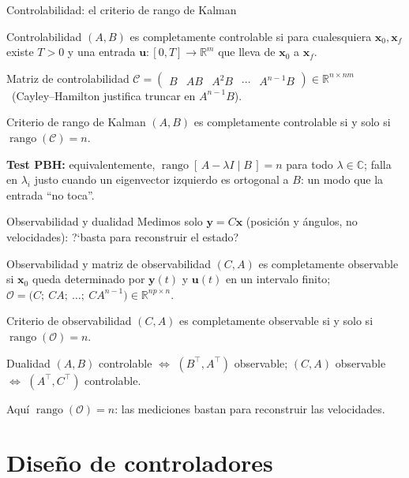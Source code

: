 \documentclass[aspectratio=169,11pt]{beamer}
\DeclareMathOperator{\rank}{rango}
\newcommand{\R}{\mathbb{R}}
\newcommand{\Cx}{\mathbb{C}}
\newcommand{\calC}{\mathcal{C}}
\newcommand{\calO}{\mathcal{O}}
\newcommand{\xv}{\bm{x}}
\newcommand{\uv}{\bm{u}}
\newcommand{\yv}{\bm{y}}
\begin{document}
\begin{frame}{Controlabilidad: el criterio de rango de Kalman}
  \begin{cajadef}{Controlabilidad}
    $(A,B)$ es completamente controlable si para cualesquiera $\xv_0,\xv_f$
    existe $T>0$ y una entrada $\uv:[0,T]\to\R^m$ que lleva de $\xv_0$ a $\xv_f$.
  \end{cajadef}
  \begin{cajadef}{Matriz de controlabilidad}
    $\calC=\begin{pmatrix}B & AB & A^2B & \cdots & A^{n-1}B\end{pmatrix}\in\R^{n\times nm}$
    \ (Cayley--Hamilton justifica truncar en $A^{n-1}B$).
  \end{cajadef}
  \begin{cajateo}{Criterio de rango de Kalman}
    $(A,B)$ es completamente controlable si y solo si $\rank(\calC)=n$.
  \end{cajateo}
  \small\textbf{Test PBH:} equivalentemente,
  $\rank[\,A-\lambda I \mid B\,]=n$ para todo $\lambda\in\Cx$; falla en
  $\lambda_i$ justo cuando un eigenvector izquierdo es ortogonal a $B$: un modo
  que la entrada ``no toca''.
\end{frame}

\begin{frame}{Observabilidad y dualidad}
  Medimos solo $\yv=C\xv$ (posici\'on y \'angulos, no velocidades):
  ?`basta para reconstruir el estado?
  \begin{cajadef}{Observabilidad y matriz de observabilidad}
    $(C,A)$ es completamente observable si $\xv_0$ queda determinado por
    $\yv(t)$ y $\uv(t)$ en un intervalo finito;
    $\calO=\bigl(C;\ CA;\ \dots;\ CA^{n-1}\bigr)\in\R^{np\times n}$.
  \end{cajadef}
  \begin{cajateo}{Criterio de observabilidad}
    $(C,A)$ es completamente observable si y solo si $\rank(\calO)=n$.
  \end{cajateo}
  \begin{cajateo}{Dualidad}
    $(A,B)$ controlable $\iff$ $(B^\top,A^\top)$ observable; \quad
    $(C,A)$ observable $\iff$ $(A^\top,C^\top)$ controlable.
  \end{cajateo}
  \small Aqu\'i $\rank(\calO)=n$: las mediciones bastan para reconstruir las velocidades.
\end{frame}

\section{Diseño de controladores}
\end{document}
